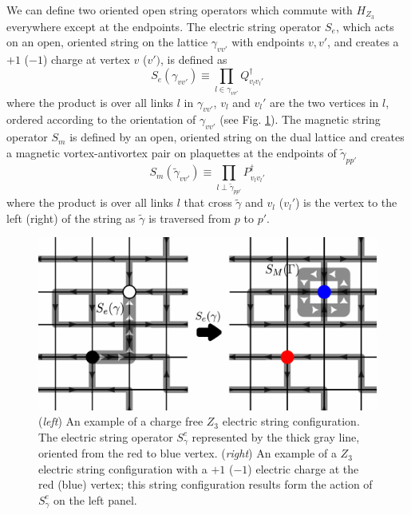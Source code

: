 \documentclass[twocolumn,prb,aps,floatfix,superscriptaddress]{revtex4-1}
\newcommand{\figref}[1]{Fig. \ref{#1}}
\begin{document}
We can define two oriented open string operators which commute with $H_{Z_3}$ everywhere except at the endpoints. The electric string operator $S_e$, which acts on an open, oriented string on the lattice $\gamma_{vv'}$ with endpoints $v,v'$, and creates a $+1$ ($-1$) charge at vertex $v$ ($v')$, is defined as
\begin{equation}
    S_e \left( \gamma_{vv'} \right) \equiv \prod_{l \in \gamma_{vv'}} Q_{v_l v_l'}^\dagger
\end{equation}
where the product is over all links $l$ in $\gamma_{vv'}$, $v_l$ and $v_l'$ are the two vertices in $l$, ordered according to the orientation of $\gamma_{vv'}$ (see \figref{fig:example_elec_string}). The magnetic string operator $S_m$ is defined by an open, oriented string on the dual lattice and creates a magnetic vortex-antivortex pair on plaquettes at the endpoints of $\tilde{\gamma}_{pp'}$
\begin{equation}
    S_m \left( \tilde{\gamma}_{vv'} \right) \equiv \prod_{l \perp \tilde{\gamma}_{pp'}} P_{v_l v_l'}^\dagger
\end{equation}
where the product is over all links $l$ that cross $\tilde{\gamma}$ and $v_l$ ($v_l'$) is the vertex to the left (right) of the string as $\tilde{\gamma}$ is traversed from $p$ to $p'$. 
\begin{figure}[t]
    \centering
    \includegraphics[width=1.0\linewidth]{example_elec_string.pdf}
    \caption{ ({\it left}) An example of a charge free $Z_3$ electric string configuration. The electric string operator $S_\gamma^e$ represented by the thick gray line, oriented from the red to blue vertex. ({\it right}) An example of a $Z_3$ electric string configuration with a $+1$ ($-1$) electric charge at the red (blue) vertex; this string configuration results form the action of $S_\gamma^e$ on the left panel.  }
    \label{fig:example_elec_string}
\end{figure}
\end{document}
